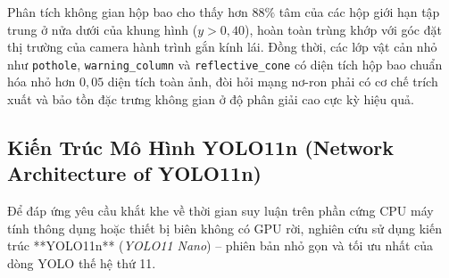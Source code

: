 Phân tích không gian hộp bao cho thấy hơn $88\%$ tâm của các hộp giới hạn tập trung ở nửa dưới của khung hình ($y > 0,40$), hoàn toàn trùng khớp với góc đặt thị trường của camera hành trình gắn kính lái. Đồng thời, các lớp vật cản nhỏ như \texttt{pothole}, \texttt{warning\_column} và \texttt{reflective\_cone} có diện tích hộp bao chuẩn hóa nhỏ hơn $0,05$ diện tích toàn ảnh, đòi hỏi mạng nơ-ron phải có cơ chế trích xuất và bảo tồn đặc trưng không gian ở độ phân giải cao cực kỳ hiệu quả.

\subsection{Kiến Trúc Mô Hình YOLO11n (Network Architecture of YOLO11n)}
\label{subsec:kien_truc_yolo11n}

Để đáp ứng yêu cầu khắt khe về thời gian suy luận trên phần cứng CPU máy tính thông dụng hoặc thiết bị biên không có GPU rời, nghiên cứu sử dụng kiến trúc **YOLO11n** (\textit{YOLO11 Nano}) – phiên bản nhỏ gọn và tối ưu nhất của dòng YOLO thế hệ thứ 11.

